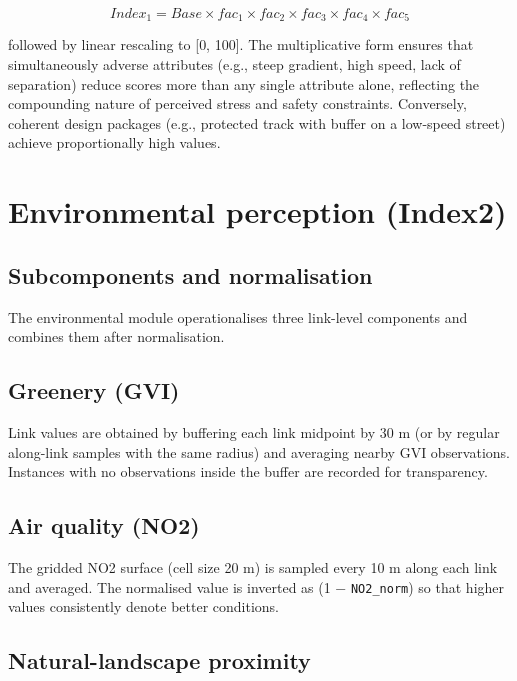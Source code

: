 \documentclass[
  12pt,
  oneside]{book}
\begin{document}
\[Index_{1} = Base \times fac_{1} \times fac_{2} \times fac_{3} \times fac_{4} \times fac_{5}\]

followed by linear rescaling to {[}0, 100{]}. The multiplicative form ensures that simultaneously adverse attributes (e.g., steep gradient, high speed, lack of separation) reduce scores more than any single attribute alone, reflecting the compounding nature of perceived stress and safety constraints. Conversely, coherent design packages (e.g., protected track with buffer on a low-speed street) achieve proportionally high values.

\section{Environmental perception (Index2)}\label{environmental-perception-index2}

\subsection{Subcomponents and normalisation}\label{subcomponents-and-normalisation}

The environmental module operationalises three link-level components and combines them after normalisation.

\subsection{Greenery (GVI)}\label{greenery-gvi}

Link values are obtained by buffering each link midpoint by 30 m (or by regular along-link samples with the same radius) and averaging nearby GVI observations. Instances with no observations inside the buffer are recorded for transparency.

\subsection{Air quality (NO2)}\label{air-quality-no2}

The gridded NO2 surface (cell size 20 m) is sampled every 10 m along each link and averaged. The normalised value is inverted as (1 − \texttt{NO2\_norm}) so that higher values consistently denote better conditions.

\subsection{Natural-landscape proximity}\label{natural-landscape-proximity}
\end{document}
